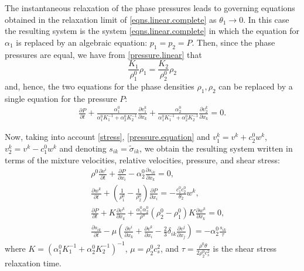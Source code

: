 \documentclass[3p,times,table]{article}
\begin{document}
The instantaneous relaxation of the phase pressures leads to governing 
equations obtained in the relaxation limit of \eqref{eqns.linear.complete} as 
$\theta_1 \rightarrow 0$.
In this case the resulting system is the system 
\eqref{eqns.linear.complete} in which the equation for $\alpha_1$ is replaced 
by an algebraic equation: $p_1=p_2=P$. Then, since the phase pressures are 
equal,  we have from \eqref {pressure.linear} that
$$\frac{K_1}{\rho^0_1} \rho_1=\frac{K_2}{\rho^0_2} \rho_2$$  
and, hence, the two equations for the phase densities $\rho_1,\rho_2$ can be 
replaced by 
a single equation for the pressure $P$:
\begin{align}\label{pressure.equation}
\frac{\partial P}{\partial t} +\frac{\alpha_1^0}{\alpha_1^0 K_1^{-1}+\alpha_2^0 K_2^{-1}}
\frac{\partial v_1^k}{\partial x_k}+
\frac{\alpha_2^0}{\alpha_1^0 K_1^{-1}+\alpha_2^0 K_2^{-1}}
\frac{\partial v_2^k}{\partial x_k} =0.
\end{align}

Now, taking into account \eqref{stress}, \eqref{pressure.equation} and $v_1^k=v^k+c_2^0w^k$, 
$v_2^k=v^k-c_1^0w^k$ and denoting $s_{ik}=\tilde \sigma_{ik}$, we obtain the resulting 
system written in terms of the mixture velocities, relative velocities, 
pressure, and shear stress:
\begin{subequations}\label{stress.velocity}
	\begin{eqnarray} 
&& \rho^0 \frac{\partial v^i}{\partial t}+\frac{\partial P}{\partial x_i}-
\alpha^0_2 \frac{\partial s_{ik}}{\partial x_k} = 0,  \\
&& \frac{\partial w^k}{\partial t}+ \left(\frac{1}{\rho_1^0} - 
\frac{1}{\rho_2^0}\right)\frac{\partial P}{\partial x_i}=
-\frac{c_1^0c_2^0}{\theta_2}w^k,  \label{stress.velocity.w}\\
&& \frac{\partial P}{\partial t} +K\frac{\partial v^k}{\partial x_k}+
\frac{\alpha_1^0\alpha_2^0}{\rho^0}\left(\rho^0_2-\rho^0_1 \right)
K\frac{\partial w^k}{\partial x_k} =0,   \\   \label{sij}
&&\frac{\partial s_{ik}}{\partial t} - 
\mu\left(\frac{\partial v^i}{\partial x_k} +\frac{\partial v^k}{\partial x_i}-
\frac{2}{3}\delta_{ik}\frac{\partial v^j}{\partial x_j} \right) = 
- \alpha_2^0 \frac{s_{ik}}{\tau}  
\end{eqnarray}
\end{subequations}
where $K=\left(\alpha_1^0 K_1^{-1}+\alpha_2^0 K_2^{-1}\right)^{-1}$, 
$\mu=\rho_2^0 c_s^2$, and $\tau=\frac{\rho^0 \theta}{2 \rho^0_2 c_s^2}$ is the 
shear stress relaxation time.
\end{document}
